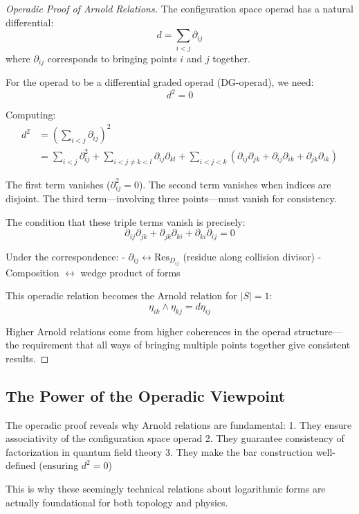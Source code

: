 \begin{proof}[Operadic Proof of Arnold Relations]

The configuration space operad has a natural differential:
$$d = \sum_{i<j} \partial_{ij}$$
where $\partial_{ij}$ corresponds to bringing points $i$ and $j$ together.

For the operad to be a differential graded operad (DG-operad), we need:
$$d^2 = 0$$

Computing:
\begin{align}
d^2 &= \left(\sum_{i<j} \partial_{ij}\right)^2 \\
&= \sum_{i<j} \partial_{ij}^2 + \sum_{i<j \neq k<l} \partial_{ij} \partial_{kl} + \sum_{i<j<k} (\partial_{ij}\partial_{jk} + \partial_{ij}\partial_{ik} + \partial_{jk}\partial_{ik})
\end{align}

The first term vanishes ($\partial_{ij}^2 = 0$). The second term vanishes when indices are disjoint. The third term—involving three points—must vanish for consistency.

The condition that these triple terms vanish is precisely:
$$\partial_{ij}\partial_{jk} + \partial_{jk}\partial_{ki} + \partial_{ki}\partial_{ij} = 0$$

Under the correspondence:
- $\partial_{ij} \leftrightarrow \text{Res}_{D_{ij}}$ (residue along collision divisor)
- Composition $\leftrightarrow$ wedge product of forms

This operadic relation becomes the Arnold relation for $|S| = 1$:
$$\eta_{ik} \wedge \eta_{kj} = d\eta_{ij}$$

Higher Arnold relations come from higher coherences in the operad structure—the requirement that all ways of bringing multiple points together give consistent results.
\end{proof}

\subsection{The Power of the Operadic Viewpoint}

The operadic proof reveals why Arnold relations are fundamental:
1. They ensure associativity of the configuration space operad
2. They guarantee consistency of factorization in quantum field theory
3. They make the bar construction well-defined (ensuring $d^2 = 0$)

This is why these seemingly technical relations about logarithmic forms are actually foundational for both topology and physics.

